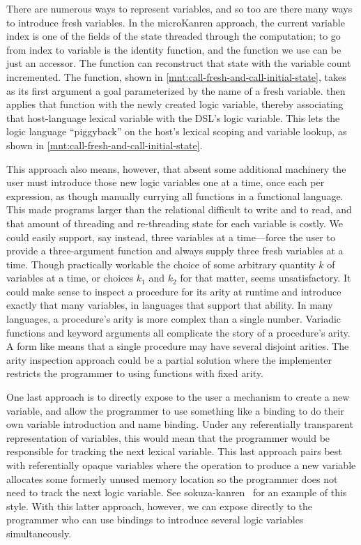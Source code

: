 \documentclass[sigplan,balance=true,pbalance=true,natbib=false]{acmart}
\begin{document}
There are numerous ways to represent variables, and so too are there
many ways to introduce fresh variables. In the microKanren approach,
the current variable index is one of the fields of the state threaded
through the computation; to go from index to variable is the identity
function, and the  function we use can be
just an accessor. The function  can
reconstruct that state with the variable count incremented. The
 function, shown in
\cref{mnt:call-fresh-and-call-initial-state}, takes as its first
argument a goal parameterized by the name of a fresh variable.
 then applies that function with the newly
created logic variable, thereby associating that host-language lexical
variable with the DSL's logic variable. This lets the logic language
\enquote{piggyback} on the host's lexical scoping and variable lookup,
as shown in \cref{mnt:call-fresh-and-call-initial-state}.

This approach also means, however, that absent some additional
machinery the user must introduce those new logic variables one at a
time, once each per  expression, as though
manually currying all functions in a functional language. This made
programs larger than the relational  difficult to
write and to read, and that amount of threading and re-threading state
for each variable is costly. We could easily support, say instead,
three variables at a time---force the user to provide a three-argument
function and always supply three fresh variables at a time. Though
practically workable the choice of some arbitrary quantity $k$ of
variables at a time, or choices $k_{1}$ and $k_{2}$ for that matter,
seems unsatisfactory. It could make sense to inspect a procedure for
its arity at runtime and introduce exactly that many variables, in
languages that support that ability. In many languages, a procedure's
arity is more complex than a single number. Variadic functions and
keyword arguments all complicate the story of a procedure's arity. A
form like  means that a single procedure may
have several disjoint arities. The arity inspection approach could be
a partial solution where the implementer restricts the programmer to
using functions with fixed arity.

One last approach is to directly expose to the user a mechanism to
create a new variable, and allow the programmer to use something like
a  binding to do their own variable introduction and
name binding. Under any referentially transparent representation of
variables, this would mean that the programmer would be responsible
for tracking the next lexical variable. This last approach pairs best
with referentially opaque variables where the operation to produce a
new variable allocates some formerly unused memory location so the
programmer does not need to track the next logic variable. See
sokuza-kanren~\cite{kiselyov2006taste} for an example of this style.
With this latter approach, however, we can expose 
directly to the programmer who can use  bindings to
introduce several logic variables simultaneously.
\end{document}

